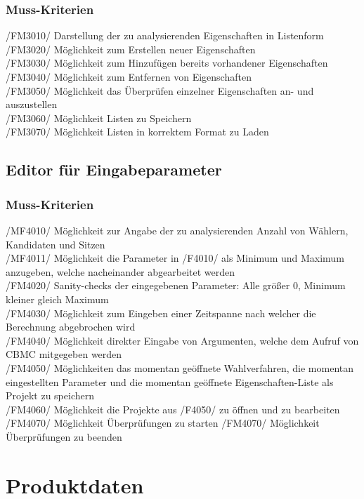 \documentclass[a4paper]{scrreprt}
\begin{document}
\subsection{Muss-Kriterien}
/FM3010/ Darstellung der zu analysierenden Eigenschaften in Listenform \\
/FM3020/ Möglichkeit zum Erstellen neuer Eigenschaften \\
/FM3030/ Möglichkeit zum Hinzufügen bereits vorhandener Eigenschaften \\
/FM3040/ Möglichkeit zum Entfernen von Eigenschaften \\
/FM3050/ Möglichkeit das Überprüfen einzelner Eigenschaften an- und auszustellen \\
/FM3060/ Möglichkeit Listen zu Speichern \\
/FM3070/ Möglichkeit Listen in korrektem Format zu Laden \\


\section{Editor für Eingabeparameter}
\subsection{Muss-Kriterien}
/MF4010/ Möglichkeit zur Angabe der zu analysierenden Anzahl von Wählern, Kandidaten und Sitzen \\
/MF4011/ Möglichkeit die Parameter in /F4010/ als Minimum und Maximum anzugeben, welche nacheinander abgearbeitet werden \\
/FM4020/ Sanity-checks der eingegebenen Parameter: Alle größer 0, Minimum kleiner gleich Maximum \\
/FM4030/ Möglichkeit zum Eingeben einer Zeitspanne nach welcher die Berechnung abgebrochen wird \\
/FM4040/ Möglichkeit direkter Eingabe von Argumenten, welche dem Aufruf von CBMC mitgegeben werden \\
/FM4050/ Möglichkeiten das momentan geöffnete Wahlverfahren, die momentan eingestellten Parameter und die momentan geöffnete Eigenschaften-Liste als Projekt zu speichern \\
/FM4060/ Möglichkeit die Projekte aus /F4050/ zu öffnen und zu bearbeiten
/FM4070/ Möglichkeit Überprüfungen zu starten
/FM4070/ Möglichkeit Überprüfungen zu beenden

\chapter{Produktdaten}
\end{document}

